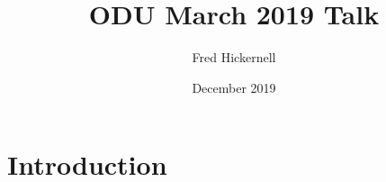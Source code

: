 \documentclass{article}
\title{ODU March 2019 Talk}
\author{Fred Hickernell}
\date{December 2019}
\begin{document}
\maketitle

\section{Introduction}
\end{document}
